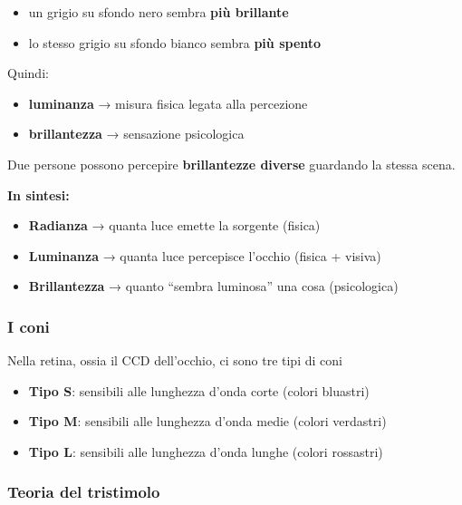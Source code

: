 \documentclass[
]{article}
\providecommand{\tightlist}{%
  \setlength{\itemsep}{0pt}\setlength{\parskip}{0pt}}
\begin{document}
\begin{itemize}
  \begin{itemize}
  \tightlist
  \item
    un grigio su sfondo nero sembra \textbf{più brillante}
  \item
    lo stesso grigio su sfondo bianco sembra \textbf{più spento}
  \end{itemize}

  Quindi:

  \begin{itemize}
  \tightlist
  \item
    \textbf{luminanza} → misura fisica legata alla percezione
  \item
    \textbf{brillantezza} → sensazione psicologica
  \end{itemize}

  Due persone possono percepire \textbf{brillantezze diverse} guardando la stessa scena.
\end{itemize}

\textbf{In sintesi:}

\begin{itemize}
\tightlist
\item
  \textbf{Radianza} → quanta luce emette la sorgente (fisica)
\item
  \textbf{Luminanza} → quanta luce percepisce l'occhio (fisica + visiva)
\item
  \textbf{Brillantezza} → quanto ``sembra luminosa'' una cosa (psicologica)
\end{itemize}

\hypertarget{i-coni}{%
\subsubsection{I coni}\label{i-coni}}

Nella retina, ossia il CCD dell'occhio, ci sono tre tipi di coni

\begin{itemize}
\tightlist
\item
  \textbf{Tipo S}: sensibili alle lunghezza d'onda corte (colori bluastri)
\item
  \textbf{Tipo M}: sensibili alle lunghezza d'onda medie (colori verdastri)
\item
  \textbf{Tipo L}: sensibili alle lunghezza d'onda lunghe (colori rossastri)
\end{itemize}

\hypertarget{teoria-del-tristimolo}{%
\subsubsection{Teoria del tristimolo}\label{teoria-del-tristimolo}}
\end{document}

